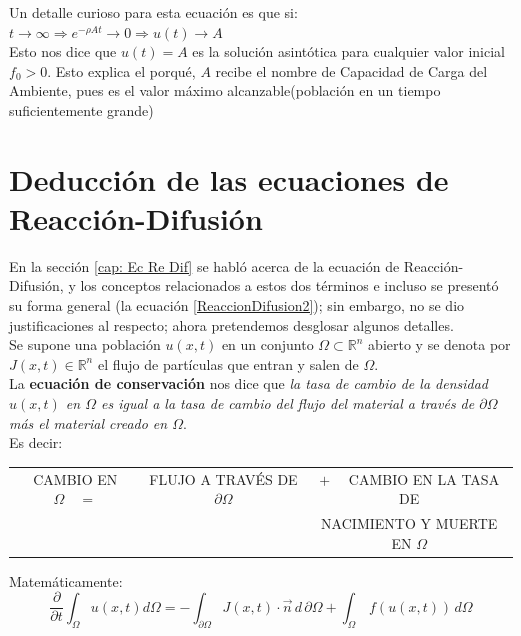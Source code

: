 Un detalle curioso para esta ecuación es que si: $ t\rightarrow \infty \Rightarrow { e }^{ -\rho At }\rightarrow 0\Rightarrow u(t)\rightarrow A$\\

Esto nos dice que $u(t)=A$ es la solución asintótica para cualquier valor inicial ${ f }_{ 0 }>0$. Esto explica el porqué, $A$ recibe el nombre de Capacidad de Carga del Ambiente, pues es el valor máximo alcanzable(población en un tiempo suficientemente grande)
\section{Deducción de las ecuaciones de Reacción-Difusión}
En la sección \ref{cap: Ec Re Dif} se habló acerca de la ecuación de Reacción-Difusión, y los conceptos relacionados a estos dos términos e incluso se presentó su forma general (la ecuación \eqref{ReaccionDifusion2}); sin embargo, no se dio justificaciones al respecto; ahora pretendemos desglosar algunos detalles.\\

Se supone una población $u(x,t)$ en un conjunto $\Omega \subset \mathbb{R}^n$ abierto y se denota por $ J(x,t) \in \mathbb{R}^n$ el flujo de partículas que entran y salen de $\Omega$.\\

La \textbf{ecuación de conservación} nos dice que \textit{la tasa de cambio de la densidad $u(x,t)$ en $\Omega$ es igual a la tasa de cambio del flujo del material a través de $\partial \Omega$ más el material creado en $\Omega$}.\\

Es decir:

\begin{center}
	\begin{tabular}{c c c}
		CAMBIO EN $\Omega \quad = $ & FLUJO A TRAVÉS DE $\partial\Omega$ & $+\quad$ CAMBIO EN LA TASA DE  \\
	 	 &  & NACIMIENTO Y MUERTE EN $\Omega$ \\
	\end{tabular}
\end{center}

Matemáticamente:\\

\begin{equation}
	\dfrac { \partial  }{ \partial t } \int _{ \Omega  }{ u(x,t)d\Omega  } =-\int _{ \partial \Omega  }{ J(x,t)\cdot \vec {n}\, d\,\partial \Omega } +\int_{ \Omega}\,{ f(u(x,t))\,d\Omega }
	\label{eq:reacdifintegral}
\end{equation}\\

